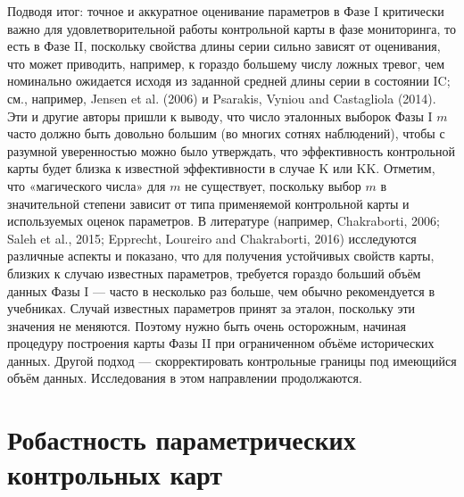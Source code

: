 Подводя итог: точное и аккуратное оценивание параметров в Фазе I критически важно для удовлетворительной работы контрольной карты в фазе мониторинга, то есть в Фазе II, поскольку свойства длины серии сильно зависят от оценивания, что может приводить, например, к гораздо большему числу ложных тревог, чем номинально ожидается исходя из заданной средней длины серии в состоянии IC; см., например, Jensen et al. (2006) и Psarakis, Vyniou and Castagliola (2014). Эти и другие авторы пришли к выводу, что число эталонных выборок Фазы I \(m\) часто должно быть довольно большим (во многих сотнях наблюдений), чтобы с разумной уверенностью можно было утверждать, что эффективность контрольной карты будет близка к известной эффективности в случае K или KK. Отметим, что «магического числа» для \(m\) не существует, поскольку выбор \(m\) в значительной степени зависит от типа применяемой контрольной карты и используемых оценок параметров. В литературе (например, Chakraborti, 2006; Saleh et al., 2015; Epprecht, Loureiro and Chakraborti, 2016) исследуются различные аспекты и показано, что для получения устойчивых свойств карты, близких к случаю известных параметров, требуется гораздо больший объём данных Фазы I — часто в несколько раз больше, чем обычно рекомендуется в учебниках. Случай известных параметров принят за эталон, поскольку эти значения не меняются. Поэтому нужно быть очень осторожным, начиная процедуру построения карты Фазы II при ограниченном объёме исторических данных. Другой подход — скорректировать контрольные границы под имеющийся объём данных. Исследования в этом направлении продолжаются.

\section{Робастность параметрических контрольных карт}

